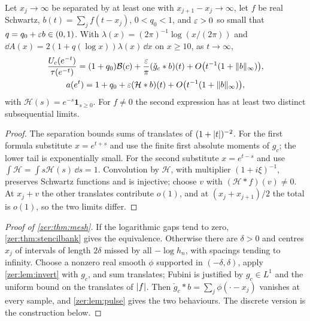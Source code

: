 \begin{lemma}\label{zer:lem:pulse}
Let $x_j\to\infty$ be separated by at least one with $x_{j+1}-x_j\to\infty$, let $f$ be real Schwartz,
$b(t)=\sum_jf(t-x_j)$, $0<q_0<1$, and $\varepsilon>0$ so small that $q=q_0+\varepsilon b\in(0,1)$. With
$\lambda(x)=(2\pi)^{-1}\log(x/(2\pi))$ and $\dd A(x)=2(1+q(\log x))\lambda(x)\,\dd x$ on $x\ge10$, as $t\to\infty$,
\begin{gather*}
 \frac{U_c(e^{-t})}{\tau(e^{-t})}=(1+q_0)\mathcal B(c)+\frac{\varepsilon}\pi(\check g_c*b)(t)+O\bigl(t^{-1}(1+\lVert b\rVert_\infty)\bigr),\\
 a(e^t)=1+q_0+\varepsilon(\mathcal H*b)(t)+O\bigl(t^{-1}(1+\lVert b\rVert_\infty)\bigr),
\end{gather*}
with $\mathcal H(s)=e^{-s}\mathbf 1_{s\ge0}$. For $f\ne0$ the second expression has at least two distinct
subsequential limits.
\end{lemma}
\begin{proof}
The separation bounds sums of translates of $(1+\lvert t\rvert)^{-2}$. For the first formula substitute $x=e^{t+s}$ and
use the finite first absolute moments of $g_c$; the lower tail is exponentially small. For the second
substitute $x=e^{t-s}$ and use $\int\mathcal H=\int s\mathcal H(s)\,\dd s=1$. Convolution by $\mathcal H$, with
multiplier $(1+i\xi)^{-1}$, preserves Schwartz functions and is injective; choose $v$ with
$(\mathcal H*f)(v)\ne0$. At $x_j+v$ the other translates contribute $o(1)$, and at $(x_j+x_{j+1})/2$ the total is
$o(1)$, so the two limits differ.
\end{proof}

\begin{proof}[Proof of \cref{zer:thm:mesh}]
If the logarithmic gaps tend to zero, \cref{zer:thm:stencilbank} gives the equivalence. Otherwise there are
$\delta>0$ and centres $x_j$ of intervals of length $2\delta$ missed by all $-\log h_n$, with spacings tending
to infinity. Choose a nonzero real smooth $\phi$ supported in $(-\delta,\delta)$, apply \cref{zer:lem:invert}
with $g_c$, and sum translates; Fubini is justified by $g_c\in L^1$ and the uniform bound on the translates of
$\lvert f\rvert$. Then $\check g_c*b=\sum_j\phi(\cdot-x_j)$ vanishes at every sample, and \cref{zer:lem:pulse} gives the
two behaviours. The discrete version is the construction below.
\end{proof}

